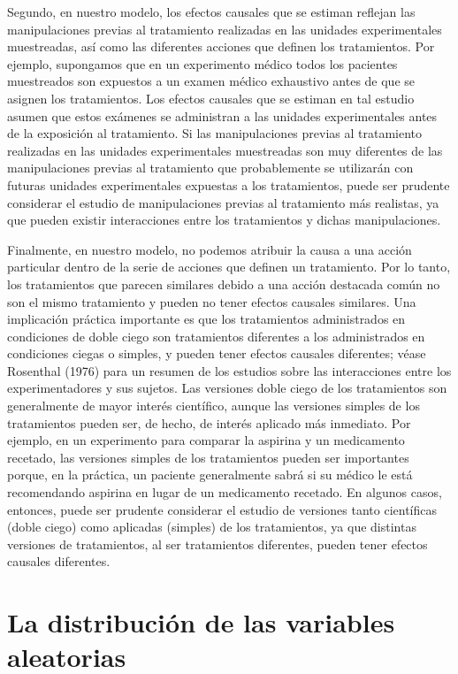 \documentclass[12pt,a4paper]{article}
\begin{document}
Segundo, en nuestro modelo, los efectos causales que se estiman reflejan las manipulaciones previas al tratamiento realizadas en las unidades experimentales muestreadas, así como las diferentes acciones que definen los tratamientos.  Por ejemplo, supongamos que en un experimento médico todos los pacientes muestreados son expuestos a un examen médico exhaustivo antes de que se asignen los tratamientos. Los efectos causales que se estiman en tal estudio asumen que estos exámenes se administran a las unidades experimentales antes de la exposición al tratamiento. Si las manipulaciones previas al tratamiento realizadas en las unidades experimentales muestreadas son muy diferentes de las manipulaciones previas al tratamiento que probablemente se utilizarán con futuras unidades experimentales expuestas a los tratamientos, puede ser prudente considerar el estudio de manipulaciones previas al tratamiento más realistas, ya que pueden existir interacciones entre los tratamientos y dichas manipulaciones.

Finalmente, en nuestro modelo, no podemos atribuir la causa a una acción particular dentro de la serie de acciones que definen un tratamiento.  Por lo tanto, los tratamientos que parecen similares debido a una acción destacada común no son el mismo tratamiento y pueden no tener efectos causales similares. Una implicación práctica importante es que los tratamientos administrados en condiciones de doble ciego son tratamientos diferentes a los administrados en condiciones ciegas o simples, y pueden tener efectos causales diferentes; véase Rosenthal (1976) para un resumen de los estudios sobre las interacciones entre los experimentadores y sus sujetos. Las versiones doble ciego de los tratamientos son generalmente de mayor interés científico, aunque las versiones simples de los tratamientos pueden ser, de hecho, de interés aplicado más inmediato.  Por ejemplo, en un experimento para comparar la aspirina y un medicamento recetado, las versiones simples de los tratamientos pueden ser importantes porque, en la práctica, un paciente generalmente sabrá si su médico le está recomendando aspirina en lugar de un medicamento recetado.  En algunos casos, entonces, puede ser prudente considerar el estudio de versiones tanto científicas (doble ciego) como aplicadas (simples) de los tratamientos, ya que distintas versiones de tratamientos, al ser tratamientos diferentes, pueden tener efectos causales diferentes. 

\section{La distribución de las variables aleatorias}
\end{document}
